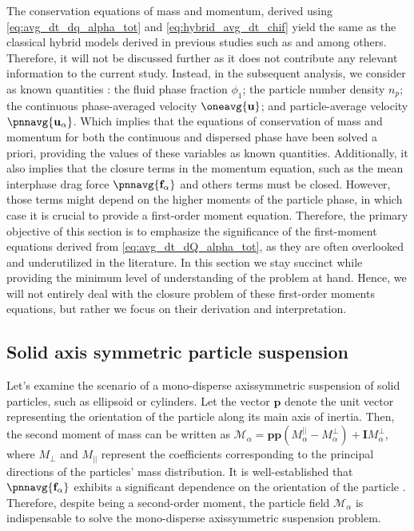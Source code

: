 

The conservation equations of mass and momentum, derived using \ref{eq:avg_dt_dq_alpha_tot} and \ref{eq:hybrid_avg_dt_chif} yield the same as the classical hybrid models derived in previous studies such as \citet{jackson1997locally} and \citet{zhang1997momentum} among others.
Therefore, it will not be discussed further as it does not contribute any relevant information to the current study.
Instead, in the subsequent analysis, we consider as known quantities : the fluid phase fraction $\phi_1$;
the particle number density $n_p$; the continuous phase-averaged velocity $\oneavg{\textbf{u}}$; and particle-average velocity $\pnnavg{\textbf{u}_\alpha}$. 
Which implies that the equations of conservation of mass and momentum for both the continuous and dispersed phase have been solved a priori, providing the values of these variables as known quantities.
Additionally, it also implies that the closure terms in the momentum equation, such as the mean interphase drag force $\pnnavg{\textbf{f}_\alpha}$ and others terms must be closed. 
However, those terms might depend on the higher moments of the particle phase, in which case it is crucial to provide a first-order moment equation. 
Therefore, the primary objective of this section is to emphasize the significance of the first-moment equations derived from \ref{eq:avg_dt_dQ_alpha_tot}, as they are often overlooked and underutilized in the literature.
In this section we stay succinct while providing the minimum level of understanding of the problem at hand.
Hence, we will not entirely deal with the closure problem of these first-order moments equations, but rather we focus on their derivation and interpretation. 

\subsection{Solid axis symmetric particle suspension}

Let's examine the scenario of a mono-disperse axissymmetric suspension of solid particles, such as ellipsoid or cylinders.
Let the vector $\textbf{p}$ denote the unit vector representing the orientation of the particle along its main axis of inertia. 
Then, the second moment of mass can be written as $\mathcal{M}_\alpha =  \textbf{pp} (M_\alpha^{||} - M_\alpha^\bot) +  \textbf{I} M_\alpha^\bot$, where $M_{\bot}$ and $M_{||}$ represent the coefficients corresponding to the principal directions of the particles' mass distribution.
It is well-established that $\pnnavg{\textbf{f}_\alpha}$ exhibits a significant dependence on the orientation of the particle \citep{kim2013microhydrodynamics}.
Therefore, despite being a second-order moment, the particle field $\mathcal{M}_\alpha$ is indispensable to solve the mono-disperse axissymmetric suspension problem.


